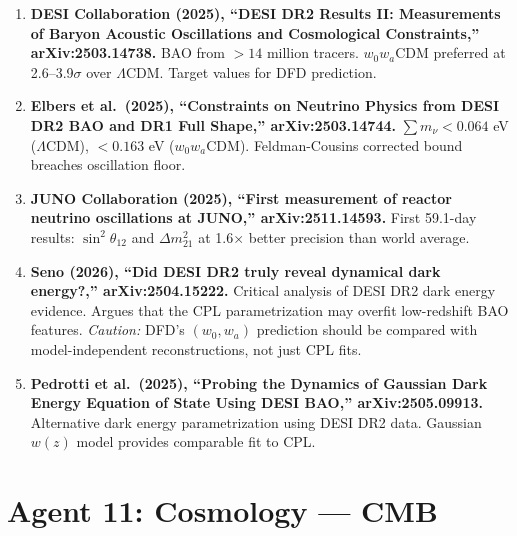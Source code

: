 \documentclass[11pt]{article}
\newcommand{\LCDM}{$\Lambda$CDM}
\begin{document}
\begin{tcolorbox}[colback=green!5!white, colframe=green!50!black,
  title=\textbf{Agent 10: NEW LITERATURE REVIEWED}]

\begin{enumerate}

\item \textbf{DESI Collaboration (2025), ``DESI DR2 Results II:
  Measurements of Baryon Acoustic Oscillations and Cosmological
  Constraints,'' arXiv:2503.14738.}
  BAO from $>14$ million tracers. $w_0w_a$CDM preferred at
  2.6--3.9$\sigma$ over \LCDM. Target values for DFD prediction.

\item \textbf{Elbers et al.\ (2025), ``Constraints on Neutrino
  Physics from DESI DR2 BAO and DR1 Full Shape,''
  arXiv:2503.14744.}
  $\sum m_\nu < 0.064$ eV (\LCDM), $< 0.163$ eV ($w_0w_a$CDM).
  Feldman-Cousins corrected bound breaches oscillation floor.

\item \textbf{JUNO Collaboration (2025), ``First measurement of
  reactor neutrino oscillations at JUNO,'' arXiv:2511.14593.}
  First 59.1-day results: $\sin^2\theta_{12}$ and $\Delta m^2_{21}$
  at 1.6$\times$ better precision than world average.

\item \textbf{Seno (2026), ``Did DESI DR2 truly reveal dynamical
  dark energy?,'' arXiv:2504.15222.}
  Critical analysis of DESI DR2 dark energy evidence. Argues that
  the CPL parametrization may overfit low-redshift BAO features.
  \emph{Caution:} DFD's $(w_0,w_a)$ prediction should be compared
  with model-independent reconstructions, not just CPL fits.

\item \textbf{Pedrotti et al.\ (2025), ``Probing the Dynamics of
  Gaussian Dark Energy Equation of State Using DESI BAO,''
  arXiv:2505.09913.}
  Alternative dark energy parametrization using DESI DR2 data.
  Gaussian $w(z)$ model provides comparable fit to CPL.

\end{enumerate}
\end{tcolorbox}


\section{Agent 11: Cosmology --- CMB}
\end{document}
